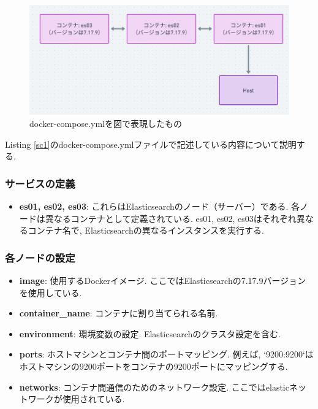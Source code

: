\begin{figure}[!ht]
  \begin{center}
    \includegraphics[width=160mm]{sotu/figure/all-7.19.9.png}
    \caption{docker-compose.ymlを図で表現したもの}
    \label{d1}
  \end{center}
\end{figure}

Listing \ref{sc1}のdocker-compose.ymlファイルで記述している内容について説明する.

\subsubsection*{サービスの定義}
\begin{itemize}
  \item \textbf{es01, es02, es03}: これらはElasticsearchのノード（サーバー）である. 各ノードは異なるコンテナとして定義されている. es01, es02, es03はそれぞれ異なるコンテナ名で, Elasticsearchの異なるインスタンスを実行する.
\end{itemize}

\subsubsection*{各ノードの設定}
\begin{itemize}
  \item \textbf{image}: 使用するDockerイメージ. ここではElasticsearchの7.17.9バージョンを使用している.
  \item \textbf{container\_name}: コンテナに割り当てられる名前.
  \item \textbf{environment}: 環境変数の設定. Elasticsearchのクラスタ設定を含む.
  \item \textbf{ports}: ホストマシンとコンテナ間のポートマッピング. 例えば, `9200:9200`はホストマシンの9200ポートをコンテナの9200ポートにマッピングする.
  \item \textbf{networks}: コンテナ間通信のためのネットワーク設定. ここではelasticネットワークが使用されている.
\end{itemize}

